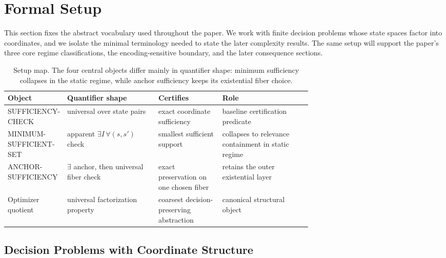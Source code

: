 \section{Formal Setup}\label{sec:formal-setup}

This section fixes the abstract vocabulary used throughout the paper. We work with finite decision problems whose state spaces factor into coordinates, and we isolate the minimal terminology needed to state the later complexity results. The same setup will support the paper's three core regime classifications, the encoding-sensitive boundary, and the later consequence sections.

\begin{table}[h]
\centering
\small
\setlength{\tabcolsep}{4pt}
\renewcommand{\arraystretch}{1.12}
\renewcommand{\tabularxcolumn}[1]{m{#1}}
\begin{tabularx}{\linewidth}{@{}>{\raggedright\arraybackslash}m{0.18\linewidth}>{\raggedright\arraybackslash}m{0.30\linewidth}>{\raggedright\arraybackslash}m{0.21\linewidth}>{\raggedright\arraybackslash}X@{}}
\toprule
\textbf{Object} & \textbf{Quantifier shape} & \textbf{Certifies} & \textbf{Role} \\
\midrule
SUFFICIENCY-CHECK & universal over state pairs & exact coordinate sufficiency & baseline certification predicate \\
\midrule
MINIMUM-SUFFICIENT-SET & apparent $\exists I\,\forall (s,s')$ check & smallest sufficient support & collapses to relevance containment in static regime \\
\midrule
ANCHOR-SUFFICIENCY & $\exists$ anchor, then universal fiber check & exact preservation on one chosen fiber & retains the outer existential layer \\
\midrule
Optimizer quotient & universal factorization property & coarsest decision-preserving abstraction & canonical structural object \\
\bottomrule
\end{tabularx}
\caption{Setup map. The four central objects differ mainly in quantifier shape: minimum sufficiency collapses in the static regime, while anchor sufficiency keeps its existential fiber choice.}
\label{tab:formal-setup}
\end{table}

\subsection{Decision Problems with Coordinate Structure}

